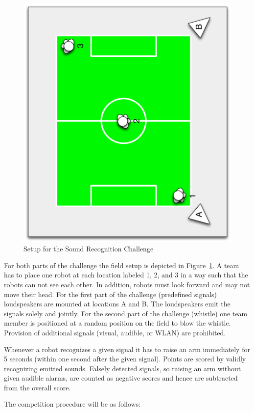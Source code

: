\documentclass[12pt]{article}
\begin{document}
\begin{figure}[th!]
\centerline{\includegraphics[width=0.6\columnwidth,angle=270]{figures/acuesthesia}}
\caption{Setup for the Sound Recognition Challenge}
\label{fig:recognition_challenge}
\end{figure}

For both parts of the challenge the field setup is depicted in Figure~\ref{fig:recognition_challenge}. A team has to place one robot at each location labeled 1, 2, and 3 in a way such that the robots can not see each other. In addition, robots must look forward and may not move their head. For the first part of the challenge (predefined signals) loudspeakers are mounted at locations A and B. The loudspeakers emit the signals solely and jointly. For the second part of the challenge (whistle) one team member is positioned at a random position on the field to blow the whistle. Provision of additional signals (visual, audible, or WLAN) are prohibited.

Whenever a robot recognizes a given signal it has to raise an arm immediately for 5 seconds (within one second after the given signal).
Points are scored by validly recognizing emitted sounds. Falsely detected signals, so raising an arm without given audible alarms, are counted as negative scores and hence are subtracted from the overall score.

The competition procedure will be as follows:
\end{document}
